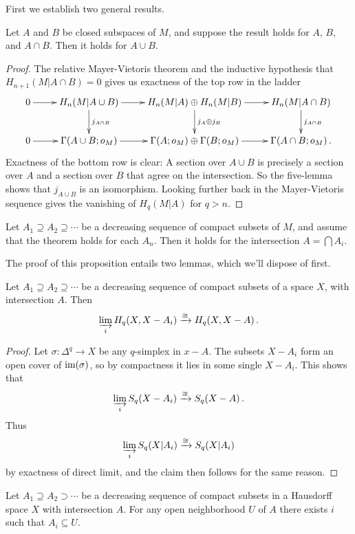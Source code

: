 First we establish two general results.
\begin{prop} 
Let $A$ and $B$ be closed subspaces of $M$, and suppose the result
holds for $A$, $B$, and $A\cap B$. Then it holds for $A\cup B$.
\label{prop-mv}
\end{prop}
\begin{proof}
The relative Mayer-Vietoris theorem and the inductive hypothesis that 
$H_{n+1}(M|A\cap B)=0$ gives us exactness of the top row in the ladder
\[
\xymatrix{
0 \ar[r] & H_n(M|A\cup B) \ar[d]^{j_{A\cap B}} \ar[r] & 
H_n(M|A)\oplus H_n(M|B) \ar[d]^{j_A\oplus j_B} \ar[r] &
H_n(M|A\cap B) \ar[d]^{j_{A\cap B}} \\
0 \ar[r] & \Gamma(A\cup B;o_M) \ar[r] & 
\Gamma(A;o_M)\oplus\Gamma(B;o_M) \ar[r] &
\Gamma(A\cap B;o_M)\,.
}\]
Exactness of the bottom row is clear: A section over $A\cup B$ is precisely
a section over $A$ and a section over $B$ that agree on the intersection.
So the five-lemma shows that $j_{A\cup B}$ is an isomorphism. 
Looking further back in the Mayer-Vietoris sequence gives the vanishing of
$H_q(M|A)$ for $q>n$.  
\end{proof}
\begin{prop}\label{prop-lim}
Let $A_1\supseteq A_2\supseteq\cdots$ be a decreasing sequence
of compact subsets of $M$, and assume that the theorem holds for each $A_n$.
Then it holds for the intersection $A=\bigcap A_i$. 
\end{prop}
The proof of this proposition entails two lemmas, which we'll dispose of first.
\begin{lemma}
\label{lem-lim-cpt}
Let $A_1\supseteq A_2\supseteq\cdots$ be a decreasing sequence of compact
subsets of a space $X$, with intersection $A$. Then 
\[
\varinjlim_iH_q(X,X-A_i)\xrightarrow{\cong}H_q(X,X-A)\,.
\]
\end{lemma}
\begin{proof}
Let $\sigma:\Delta^q\to X$ be any $q$-simplex in $x-A$. The subsets $X-A_i$
form an open cover of $\operatorname{im}(\sigma)$, so by compactness it lies in some
single $X-A_i$. This shows that 
\[
\varinjlim_iS_q(X-A_i)\xrightarrow{\cong}S_q(X-A)\,.
\]
Thus
\[
\varinjlim_iS_q(X|A_i)\xrightarrow{\cong}S_q(X|A_i)
\]
by exactness of direct limit, and the claim then follows for the same reason. 
\end{proof}
\begin{lemma}\label{lem-fip} 
Let $A_1\supseteq A_2\supset\cdots$ be a decreasing sequence of 
compact subsets in a Hausdorff space $X$ with intersection $A$. 
For any open neighborhood $U$ of $A$ there exists $i$ such that 
$A_i\subseteq U$.
\end{lemma}
